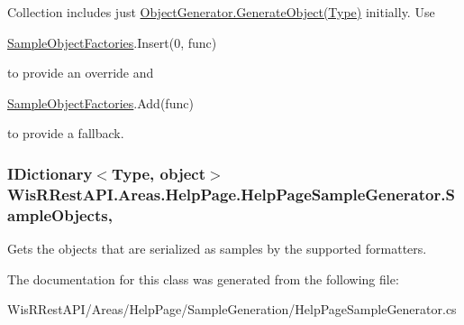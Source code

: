Collection includes just \hyperlink{class_wis_r_rest_a_p_i_1_1_areas_1_1_help_page_1_1_object_generator_a33b690209a8997bfb43ca29676c03b70}{Object\+Generator.\+Generate\+Object(\+Type)} initially. Use 
\begin{DoxyCode}
\hyperlink{class_wis_r_rest_a_p_i_1_1_areas_1_1_help_page_1_1_help_page_sample_generator_a1b2dbd19fb879825109b777e58cc89fe}{SampleObjectFactories}.Insert(0, func)
\end{DoxyCode}
 to provide an override and 
\begin{DoxyCode}
\hyperlink{class_wis_r_rest_a_p_i_1_1_areas_1_1_help_page_1_1_help_page_sample_generator_a1b2dbd19fb879825109b777e58cc89fe}{SampleObjectFactories}.Add(func)
\end{DoxyCode}
 to provide a fallback.\hypertarget{class_wis_r_rest_a_p_i_1_1_areas_1_1_help_page_1_1_help_page_sample_generator_a424a1eefe17744f2b186f13de239de76}{}
\subsubsection[{Sample\+Objects}]{\setlength{\rightskip}{0pt plus 5cm}I\+Dictionary$<$Type, object$>$ Wis\+R\+Rest\+A\+P\+I.\+Areas.\+Help\+Page.\+Help\+Page\+Sample\+Generator.\+Sample\+Objects\hspace{0.3cm}{\ttfamily [get]}, {\ttfamily [set]}}\label{class_wis_r_rest_a_p_i_1_1_areas_1_1_help_page_1_1_help_page_sample_generator_a424a1eefe17744f2b186f13de239de76}


Gets the objects that are serialized as samples by the supported formatters. 



The documentation for this class was generated from the following file\+:\begin{DoxyCompactItemize}
\item 
Wis\+R\+Rest\+A\+P\+I/\+Areas/\+Help\+Page/\+Sample\+Generation/Help\+Page\+Sample\+Generator.\+cs\end{DoxyCompactItemize}
